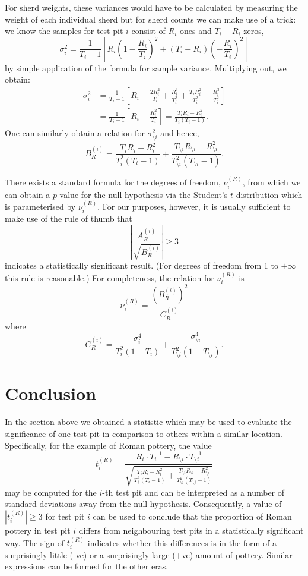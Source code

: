 \documentclass[conference]{IEEEtran}
\begin{document}
For sherd weights, these variances would have to be calculated by measuring the
weight of each individual sherd but for sherd counts we can make use of a trick: we
know the samples for test pit $i$ consist of $R_i$ ones and $T_i-R_i$ zeros,
\[
    \sigma^2_i = \frac{1}{T_i-1} \left[
        R_i\left(1-\frac{R_i}{T_i}\right)^2 +
    (T_i-R_i)\left(-\frac{R_i}{T_i}\right)^2 \right]
\]
by simple application of the formula for sample variance. Multiplying out, we
obtain:
\begin{align*}
    \sigma^2_i &= \frac{1}{T_i-1} \left[
        R_i - \frac{2R_i^2}{T_i} + \frac{R_i^3}{T_i^2} +
        \frac{T_iR_i^2}{T_i^2} - \frac{R_i^3}{T_i^2}
    \right] \\
    &= \frac{1}{T_i-1} \left[
        R_i - \frac{R_i^2}{T_i} 
    \right] =
    \frac{T_i R_i - R_i^2}{T_i(T_i-1)}.
\end{align*}
One can similarly obtain a relation for $\sigma^2_{\setminus i}$ and hence,
\[
    B^{(i)}_R =
    \frac{T_i R_i - R_i^2}{T^2_i(T_i-1)} +
    \frac{T_{\setminus i} R_{\setminus i} - R_{\setminus i}^2}{T^2_{\setminus
    i}(T_{\setminus i}-1)}.
\]

There exists a standard formula\cite{welch} for the degrees of freedom, $\nu^{(R)}_i$, from
which we can obtain a $p$-value for the null hypothesis via the Student's
$t$-distribution which is parameterised by $\nu^{(R)}_i$. For our purposes,
however, it is usually sufficient to make use of the rule of thumb that
\[
    \left|\frac{A^{(i)}_R}{\sqrt{B^{(i)}_R}}\right| \ge 3
\]
indicates a statistically significant result. (For degrees of freedom from 1 to
$+\infty$ this rule is reasonable.) For completeness, the relation for
$\nu^{(R)}_i$ is
\[
    \nu^{(R)}_i = \frac{\left( B^{(i)}_R \right)^2}{C^{(i)}_R}
\]
where
\[
    C^{(i)}_R = \frac{\sigma^4_i}{T_i^2 (1-T_i)} + \frac{\sigma^4_{\setminus
    i}}{T_{\setminus i}^2 (1-T_{\setminus i})}.
\]

\section{Conclusion}

In the section above we obtained a statistic which may be used to evaluate the
significance of one test pit in comparison to others within a similar location.
Specifically, for the example of Roman pottery, the value
\[
    t^{(R)}_i = \frac{R_i \cdot T^{-1}_i - R_{\setminus i} \cdot T^{-1}_{\setminus
    i}}{\sqrt{
    \frac{T_i R_i - R_i^2}{T^2_i(T_i-1)} +
    \frac{T_{\setminus i} R_{\setminus i} - R_{\setminus i}^2}{T^2_{\setminus
    i}(T_{\setminus i}-1)}}}
\]
may be computed for the $i$-th test pit and can be interpreted as a number of
standard deviations away from the null hypothesis. Consequently, a value of
$|t^{(R)}_i| \ge 3$ for test pit $i$ can be used to conclude that the proportion
of Roman pottery in test pit $i$ differs from neighbouring test pits in a
statistically significant way. The sign of $t^{(R)}_i$ indicates whether this
differences is in the form of a surprisingly little (-ve) or a surprisingly
large (+ve) amount of pottery. Similar expressions can be formed for the other
eras.
\end{document}
